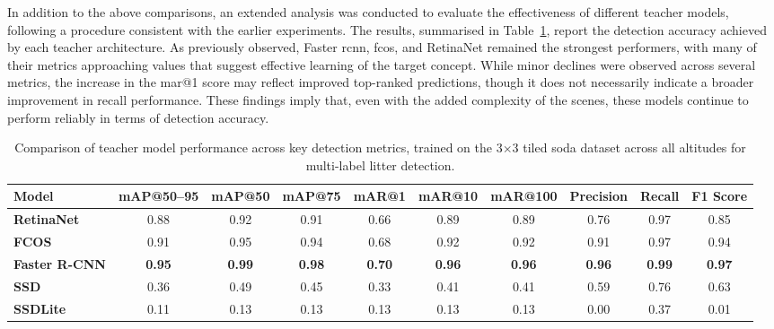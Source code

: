 In addition to the above comparisons, an extended analysis was conducted to evaluate the effectiveness of different teacher models, following a procedure consistent with the earlier experiments. The results, summarised in Table~\ref{tab:teacher_model_metrics_soda_tiled_multi}, report the detection accuracy achieved by each teacher architecture. As previously observed, Faster \gls{rcnn}, \gls{fcos}, and RetinaNet remained the strongest performers, with many of their metrics approaching values that suggest effective learning of the target concept. While minor declines were observed across several metrics, the increase in the \gls{mar}@1 score may reflect improved top-ranked predictions, though it does not necessarily indicate a broader improvement in recall performance. These findings imply that, even with the added complexity of the scenes, these models continue to perform reliably in terms of detection accuracy.

\begin{table}[!ht]
    \centering
    \begin{adjustbox}{max width=\textwidth}
    \renewcommand{\arraystretch}{1.5}
    \begin{tabular}{|l|c|c|c|c|c|c|c|c|c|}
        \hline
        \textbf{Model} & \textbf{mAP@50--95} & \textbf{mAP@50} & \textbf{mAP@75} & \textbf{mAR@1} & \textbf{mAR@10} & \textbf{mAR@100} & \textbf{Precision} & \textbf{Recall} & \textbf{F1 Score} \\ \hline \hline
        \textbf{RetinaNet} & 0.88 & 0.92 & 0.91 & 0.66 & 0.89 & 0.89 & 0.76 & 0.97 & 0.85 \\\hline
        \textbf{FCOS} & 0.91 & 0.95 & 0.94 & 0.68 & 0.92 & 0.92 & 0.91 & 0.97 & 0.94 \\\hline
        \textbf{Faster R-CNN} & \textbf{0.95} & \textbf{0.99} & \textbf{0.98} & \textbf{0.70} & \textbf{0.96} & \textbf{0.96} & \textbf{0.96} & \textbf{0.99} & \textbf{0.97} \\\hline
        \textbf{SSD} & 0.36 & 0.49 & 0.45 & 0.33 & 0.41 & 0.41 & 0.59 & 0.76 & 0.63 \\\hline
        \textbf{SSDLite} & 0.11 & 0.13 & 0.13 & 0.13 & 0.13 & 0.13 & 0.00 & 0.37 & 0.01 \\
        \hline
    \end{tabular}
    \renewcommand{\arraystretch}{1}
    \end{adjustbox}
    \caption{Comparison of teacher model performance across key detection metrics, trained on the 3$\times$3 tiled \gls{soda} dataset across all altitudes for multi-label litter detection.}
    \label{tab:teacher_model_metrics_soda_tiled_multi}
\end{table}
 
